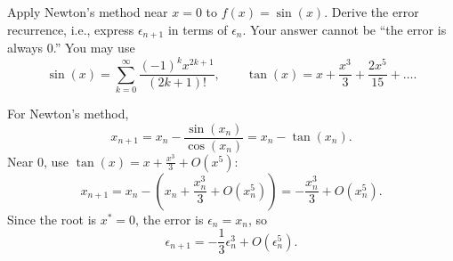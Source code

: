 \documentclass[reqno]{exam}
\begin{document}
\begin{questions}
  \question[5] Apply Newton's method near $x=0$ to $f(x)=\sin(x)$. Derive the error recurrence, i.e., express $\epsilon_{n+1}$ in terms of $\epsilon_n$. Your answer cannot be ``the error is always 0.'' You may use
  \[
    \sin(x)=\sum_{k=0}^{\infty}\frac{(-1)^k x^{2k+1}}{(2k+1)!},
    \qquad
    \tan(x)=x+\frac{x^3}{3}+\frac{2x^5}{15}+ \dots.
  \]

  \begin{solution}
    For Newton's method,
    \[
      x_{n+1}=x_n-\frac{\sin(x_n)}{\cos(x_n)}=x_n-\tan(x_n).
    \]
    Near $0$, use $\tan(x)=x+\frac{x^3}{3}+O(x^5)$:
    \[
      x_{n+1}=x_n-\left(x_n+\frac{x_n^3}{3}+O(x_n^5)\right)
      =-\frac{x_n^3}{3}+O(x_n^5).
    \]
    Since the root is $x^*=0$, the error is $\epsilon_n=x_n$, so
    \[
      \epsilon_{n+1}=-\frac{1}{3}\epsilon_n^3+O(\epsilon_n^5).
    \]
  \end{solution}
  \vfill

\end{questions}
\end{document}
